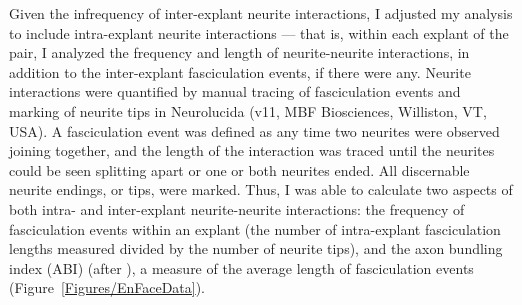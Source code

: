 Given the infrequency of inter-explant neurite interactions, I adjusted my analysis to include intra-explant neurite interactions --- that is, within each explant of the pair, I analyzed the frequency and length of neurite-neurite interactions, in addition to the inter-explant fasciculation events, if there were any.
Neurite interactions were quantified by manual tracing of fasciculation events and marking of neurite tips in Neurolucida (v11, MBF Biosciences, Williston, VT, USA).
A fasciculation event was defined as any time two neurites were observed joining together, and the length of the interaction was traced until the neurites could be seen splitting apart or one or both neurites ended.
All discernable neurite endings, or tips, were marked.
Thus, I was able to calculate two aspects of both intra- and inter-explant neurite-neurite interactions: the frequency of fasciculation events within an explant (the number of intra-explant fasciculation lengths measured divided by the number of neurite tips), and the axon bundling index (ABI) (after ), a measure of the average length of fasciculation events (Figure~\ref{Figures/EnFaceData}).
